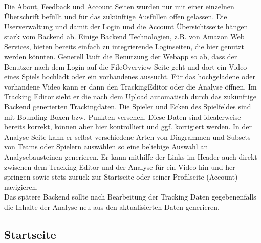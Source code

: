 Die About, Feedback und Account Seiten wurden nur mit einer einzelnen Überschrift befüllt und für das zukünftige Ausfüllen offen gelassen. Die Userverwaltung und damit der Login und die Account Übersichtsseite hängen stark vom Backend ab. Einige Backend Technologien, z.B. von Amazon Web Services, bieten bereits einfach zu integrierende Loginseiten, die hier genutzt werden könnten. Generell läuft die Benutzung der Webapp so ab, dass der Benutzer nach dem Login auf die FileOverview Seite geht und dort ein Video eines Spiels hochlädt oder ein vorhandenes aussucht. Für das hochgeladene oder vorhandene Video kann er dann den TrackingEditor oder die Analyse öffnen. Im Tracking Editor sieht er die nach dem Upload automatisch durch das zukünftige Backend generierten Trackingdaten. Die Spieler und Ecken des Spielfeldes sind mit Bounding Boxen bzw. Punkten versehen. Diese Daten sind idealerweise bereits korrekt, können aber hier kontrolliert und ggf. korrigiert werden. In der Analyse Seite kann er selbst verschiedene Arten von Diagrammen und Subsets von Teams oder Spielern auswählen so eine beliebige Auswahl an Analysebausteinen generieren. Er kann mithilfe der Links im Header auch direkt zwischen dem Tracking Editor und der Analyse für ein Video hin und her springen sowie stets zurück zur Startseite oder seiner Profilseite (Account) navigieren. \\
Das spätere Backend sollte nach Bearbeitung der Tracking Daten gegebenenfalls die Inhalte der Analyse neu aus den aktualisierten Daten generieren.

\subsection{Startseite}

